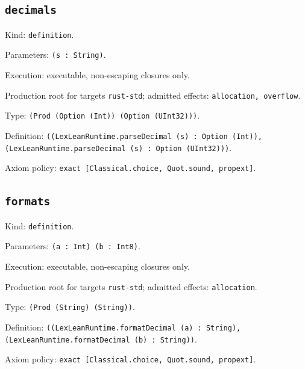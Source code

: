 \documentclass[11pt]{article}
\begin{document}
\subsection*{\texttt{decimals}}
\noindent Kind: \texttt{definition}.\par
\noindent Parameters: \texttt{(s : String)}.\par
\noindent Execution: executable, non-escaping closures only.\par
\noindent Production root for targets \texttt{rust-std}; admitted effects: \texttt{allocation, overflow}.\par
\noindent Type: \texttt{(Prod (Option (Int)) (Option (UInt32)))}.\par
\noindent Definition: \texttt{((LexLeanRuntime.parseDecimal (s) : Option (Int)), (LexLeanRuntime.parseDecimal (s) : Option (UInt32)))}.\par
\noindent Axiom policy: \texttt{exact [Classical.choice, Quot.sound, propext]}.\par
\subsection*{\texttt{formats}}
\noindent Kind: \texttt{definition}.\par
\noindent Parameters: \texttt{(a : Int) (b : Int8)}.\par
\noindent Execution: executable, non-escaping closures only.\par
\noindent Production root for targets \texttt{rust-std}; admitted effects: \texttt{allocation}.\par
\noindent Type: \texttt{(Prod (String) (String))}.\par
\noindent Definition: \texttt{((LexLeanRuntime.formatDecimal (a) : String), (LexLeanRuntime.formatDecimal (b) : String))}.\par
\noindent Axiom policy: \texttt{exact [Classical.choice, Quot.sound, propext]}.\par
\end{document}
